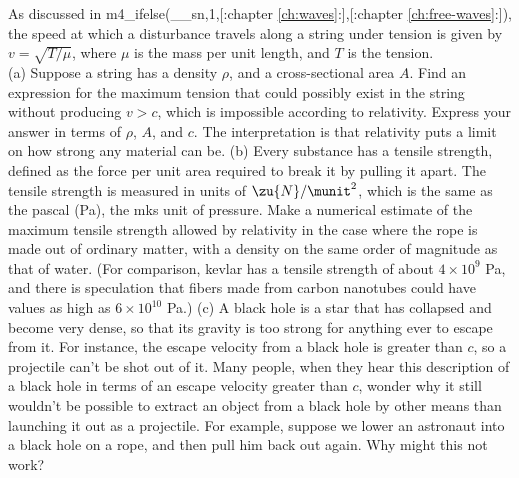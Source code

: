 As discussed in
m4_ifelse(__sn,1,[:chapter \ref{ch:waves}:],[:chapter \ref{ch:free-waves}:]), the speed at which a disturbance travels along
a string under tension is given by $v=\sqrt{T/\mu}$, where $\mu$ is the mass per unit
length, and $T$ is the tension.\\
 (a) Suppose a string has a density $\rho$, and a cross-sectional
area $A$. Find an expression for the maximum tension that could possibly exist in the string
without producing $v>c$, which is impossible according to relativity. Express your answer in
terms of $\rho$, $A$, and $c$. The interpretation is that relativity puts a limit on how
strong any material can be.\answercheck\hwendpart
(b) Every substance has a tensile strength, defined as the force
per unit area required to break it by pulling it apart. The tensile strength is measured in
units of $\zu{N}/\munit^2$, which is the same as the pascal (Pa), the mks unit of pressure.
Make a numerical estimate of the maximum tensile strength allowed by relativity in the case where
the rope is made out of ordinary matter, with a density on the same order of magnitude as
that of water. (For comparison, kevlar has a tensile strength of about $4\times10^9$ Pa,
and there is speculation that fibers made from carbon nanotubes could have
values as high as  $6\times10^{10}$ Pa.)\answercheck\hwendpart
 (c) A black hole is a star that has collapsed and become very dense, so that
its gravity is too strong for anything ever to escape from it. For instance, the escape
velocity from a black hole is greater than $c$, so a projectile can't be shot out of it.
Many people, when they hear this description of a black hole in terms of an escape velocity
greater than $c$, wonder why it still wouldn't be possible to extract an object from a black
hole by other means than launching it out as a projectile.
For example, suppose we lower an astronaut into a black hole on a rope, and then pull him
back out again. Why might this not work?\hwendpart
